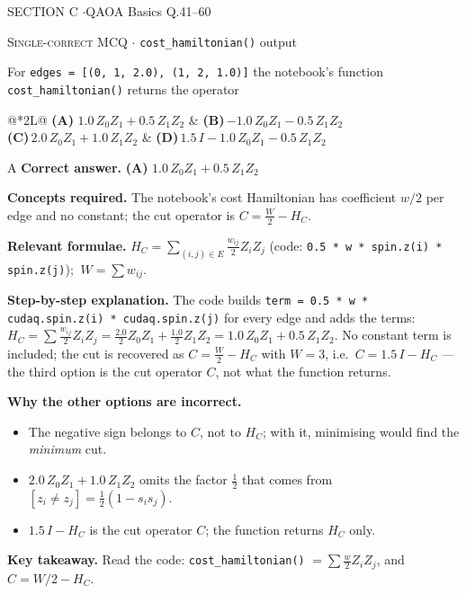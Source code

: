 \documentclass[11pt,a4paper]{article}
\newcommand{\optlabel}[1]{\textbf{(#1)}}
\newcommand{\correctlabel}[1]{\textcolor{okgreen}{\textbf{(#1)}\,\ding{51}}}
\newenvironment{qitem}[1]{\begin{list}{}{\setlength{\leftmargin}{3.3em}\setlength{\labelwidth}{3.1em}%
  \setlength{\labelsep}{0.2em}\setlength{\topsep}{3pt}\setlength{\parsep}{3pt}}\item[\textbf{Q.#1}\hfill]}{\end{list}}
\newcommand{\qsep}{\par\vspace{2pt}{\color{black!15}\hrule}\vspace{4pt}}
\newcommand{\qmeta}[2]{{\footnotesize\color{black!60}\textsc{#1} \;$\cdot$\; #2}\par}
\begin{document}
\newpage

\begin{sectionbanner}SECTION C \enspace$\cdot$\enspace QAOA Basics \hfill Q.41--60\end{sectionbanner}

\begin{qitem}{41}
\qmeta{Single-correct MCQ}{\texttt{cost\_hamiltonian()} output}
For \texttt{edges = [(0, 1, 2.0), (1, 2, 1.0)]} the notebook's function \texttt{cost\_hamiltonian()} returns the operator
\par\smallskip\noindent\begin{tabularx}{\linewidth}{@{}*{2}{L}@{}}
\correctlabel{A}\,$1.0\,Z_0Z_1 + 0.5\,Z_1Z_2$ & \optlabel{B}\,$-1.0\,Z_0Z_1 - 0.5\,Z_1Z_2$ \\[3pt]
\optlabel{C}\,$2.0\,Z_0Z_1 + 1.0\,Z_1Z_2$ & \optlabel{D}\,$1.5\,I - 1.0\,Z_0Z_1 - 0.5\,Z_1Z_2$
\end{tabularx}
\end{qitem}
\begin{solbox}{A}
\textbf{\color{brand}Correct answer.} \textcolor{okgreen}{\textbf{(A)}} $1.0\,Z_0Z_1 + 0.5\,Z_1Z_2$

\textbf{\color{brand}Concepts required.} The notebook's cost Hamiltonian has coefficient $w/2$ per edge and no constant; the cut operator is $C = \frac W2 - H_C$.

\textbf{\color{brand}Relevant formulae.} $H_C = \sum_{(i,j)\in E}\tfrac{w_{ij}}{2}Z_iZ_j$ (code: \texttt{0.5 * w * spin.z(i) * spin.z(j)}); $\ W = \sum w_{ij}$.

\textbf{\color{brand}Step-by-step explanation.} The code builds \texttt{term = 0.5 * w * cudaq.spin.z(i) * cudaq.spin.z(j)} for every edge and adds the terms:
$H_C = \sum \tfrac{w_{ij}}{2}Z_iZ_j = \tfrac{2.0}{2}Z_0Z_1 + \tfrac{1.0}{2}Z_1Z_2 = 1.0\,Z_0Z_1 + 0.5\,Z_1Z_2$.
No constant term is included; the cut is recovered as $C = \tfrac W2 - H_C$ with $W = 3$, i.e.\ $C = 1.5\,I - H_C$ --- the third
option is the cut operator $C$, not what the function returns.

\textbf{\color{brand}Why the other options are incorrect.}
\begin{itemize}[leftmargin=2.4em, itemsep=1pt, topsep=2pt]
\item[\textbf{(B)}] The negative sign belongs to $C$, not to $H_C$; with it, minimising would find the \emph{minimum} cut.
\item[\textbf{(C)}] $2.0\,Z_0Z_1 + 1.0\,Z_1Z_2$ omits the factor $\frac12$ that comes from $[z_i\neq z_j] = \frac12(1 - s_is_j)$.
\item[\textbf{(D)}] $1.5\,I - H_C$ is the cut operator $C$; the function returns $H_C$ only.
\end{itemize}
\textbf{\color{brand}Key takeaway.} Read the code: \texttt{cost\_hamiltonian()} $= \sum \frac w2 Z_iZ_j$, and $C = W/2 - H_C$.
\end{solbox}
\qsep
\end{document}
